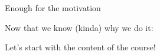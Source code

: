 \documentclass{beamer}
\begin{document}
%
%
%
%



\begin{frame}{Enough for the motivation}
\begin{flushleft}


\begin{exampleblock}{Now that we know (kinda) why we do it:}

\hfill \break
Let's start with the content of the course!
\newline

\end{exampleblock}

\end{flushleft}
\end{frame}
\end{document}
